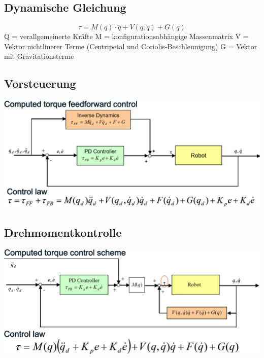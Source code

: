 \begin{minipage}{0.5\linewidth}
\subsection{Dynamische Gleichung}
    \[   \tau = M(q)\cdot \ddot{q}+ V(q,\dot{q})+G(q) \]
    Q = verallgemeinerte Kräfte\newline
    M = konfigurationsabhängige Massenmatrix\newline
    V = Vektor nichtlinerer Terme\newline
    \quad (Centripetal und Coriolis-Beschleunigung)\newline
    G = Vektor mit Gravitationsterme
\end{minipage}
\begin{minipage}{0.5\linewidth}
    \subsection{Vorsteuerung}
    \includegraphics[width=\linewidth]{./bilder/Vorsteuerung}
\end{minipage}
\begin{minipage}{0.5\linewidth}
    \subsection{Drehmomentkontrolle}
    \includegraphics[width=\linewidth]{./bilder/RegMod2}
\end{minipage}
